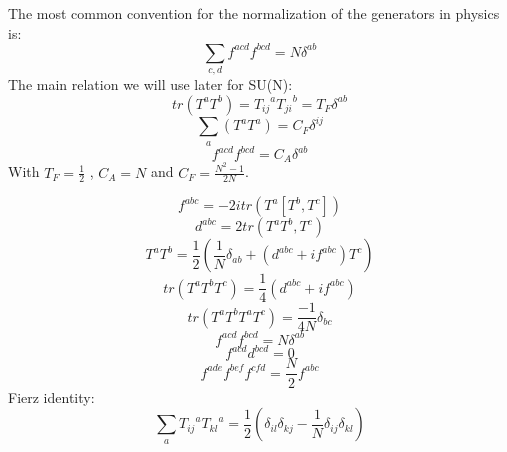 The most common convention for the normalization of the generators in physics is:
\begin{equation}
\displaystyle\sum\limits_{c,d} f^{acd} f^{bcd} = N \delta^{ab}
\end{equation}
The main relation we will use later for SU(N):
\begin{equation}
tr(T^a T^b)= {T_{ij}}^a {T_{ji}}^b = T_F \delta^{ab}
\end{equation}
\begin{equation}
\displaystyle\sum\limits_{a} (T^a T^a) = C_F \delta^{ij}
\end{equation}
\begin{equation}
f^{acd} f^{bcd} = C_A \delta^{ab}
\end{equation}
With $  T_F = \frac{1}{2} $ , $ C_A = N $ and $ C_F = \frac{N^2 -1}{2N} $.

\begin{equation}
f^{abc} = -2i tr(T^a[T^b, T^c])
\end{equation}
\begin{equation}
d^{abc} = 2 tr(T^a{T^b, T^c})
\end{equation}
\begin{equation}
T^a T^b = \frac{1}{2} (\frac{1}{N} \delta_{ab}+(d^{abc} + if^{abc})T^c)
\end{equation}
\begin{equation}
tr(T^a T^b T^c)= \frac{1}{4} (d^{abc}+if^{abc})
\end{equation}
\begin{equation}
tr(T^a T^b T^a T^c)= \frac{-1}{4N} \delta_{bc}
\end{equation}
\begin{equation}
f^{acd} f^{bcd}= N \delta^{ab}
\end{equation}
\begin{equation}
f^{acd} d^{bcd}= 0
\end{equation}
\begin{equation}
f^{ade} f^{bef} f^{cfd}= \frac{N}{2} f^{abc}
\end{equation}
Fierz identity:
\begin{equation}
\displaystyle\sum\limits_{a} {T_{ij}}^a {T_{kl}}^a = \frac{1}{2}(\delta_{il}\delta_{kj}-\frac{1}{N}\delta_{ij}\delta_{kl})
\end{equation}

